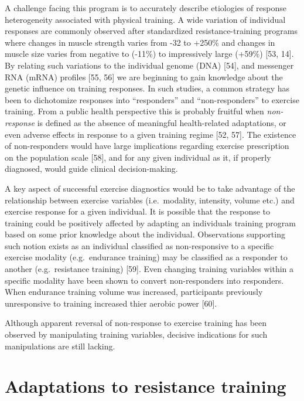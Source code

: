 \documentclass[twoside,10pt]{gihclass} %
\begin{document}
A challenge facing this program is to accurately describe etiologies of response heterogeneity associated with physical training. A wide variation of individual responses are commonly observed after standardized resistance-training programs where changes in muscle strength varies from -32 to +250\% and changes in muscle size varies from negative to (-11\%) to impressively large (+59\%)
{[}53, 14{]}.
By relating such variations to the individual genome (DNA)
{[}54{]},
and messenger RNA (mRNA) profiles
{[}55, 56{]}
we are beginning to gain knowledge about the genetic influence on training responses.
In such studies, a common strategy has been to dichotomize responses into ``responders'' and ``non-responders'' to exercise training. From a public health perspective this is probably fruitful when \emph{non-response} is defined as the absence of meaningful health-related adaptations, or even adverse effects in response to a given training regime
{[}52, 57{]}.
The existence of non-responders would have large implications regarding exercise prescription on the population scale
{[}58{]},
and for any given individual as it, if properly diagnosed, would guide clinical decision-making.

A key aspect of successful exercise diagnostics would be to take advantage of the relationship between exercise variables (i.e.~modality, intensity, volume etc.) and exercise response for a given individual.
It is possible that the response to training could be positively affected by adapting an individuals training program based on some prior knowledge about the individual.
Observations supporting such notion exists as an individual classified as non-responsive to a specific exercise modality (e.g.~endurance training) may be classified as a responder to another (e.g.~resistance training)
{[}59{]}.
Even changing training variables within a specific modality have been shown to convert non-responders into responders. When endurance training volume was increased, participants previously unresponsive to training increased thier aerobic power
{[}60{]}.

Although apparent reversal of non-response to exercise training has been observed by manipulating training variables, decisive indications for such manipulations are still lacking.

\hypertarget{adaptations-to-resistance-training}{%
\section{Adaptations to resistance training}\label{adaptations-to-resistance-training}}
\end{document}
